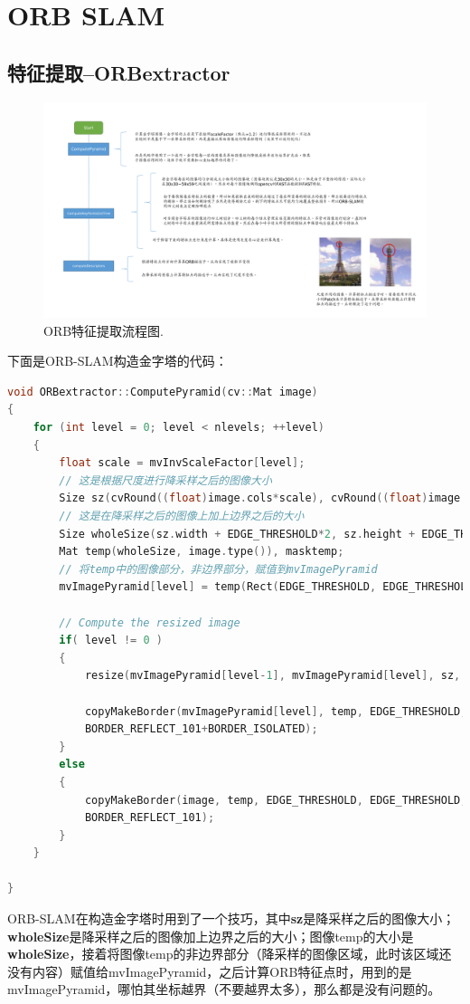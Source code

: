 \chapter{ORB SLAM}

\section{特征提取--ORBextractor}


\begin{figure}[h]%
	\centering  %
	\includegraphics[width=1.0\linewidth]{image/ORB-SLAM/ORBextractor.pdf}  %
	\caption{ORB特征提取流程图.}  %
	\label{fig:orb_extractor}   %
\end{figure}


下面是ORB-SLAM构造金字塔的代码：
\begin{lstlisting}[language = C++]
void ORBextractor::ComputePyramid(cv::Mat image)
{
	for (int level = 0; level < nlevels; ++level)
	{
		float scale = mvInvScaleFactor[level];
		// 这是根据尺度进行降采样之后的图像大小
		Size sz(cvRound((float)image.cols*scale), cvRound((float)image.rows*scale));
		// 这是在降采样之后的图像上加上边界之后的大小
		Size wholeSize(sz.width + EDGE_THRESHOLD*2, sz.height + EDGE_THRESHOLD*2);
		Mat temp(wholeSize, image.type()), masktemp;
		// 将temp中的图像部分，非边界部分，赋值到mvImagePyramid
		mvImagePyramid[level] = temp(Rect(EDGE_THRESHOLD, EDGE_THRESHOLD, sz.width, sz.height));
		
		// Compute the resized image
		if( level != 0 )
		{
			resize(mvImagePyramid[level-1], mvImagePyramid[level], sz, 0, 0, INTER_LINEAR);
			
			copyMakeBorder(mvImagePyramid[level], temp, EDGE_THRESHOLD, EDGE_THRESHOLD, EDGE_THRESHOLD, EDGE_THRESHOLD,
			BORDER_REFLECT_101+BORDER_ISOLATED);            
		}
		else
		{
			copyMakeBorder(image, temp, EDGE_THRESHOLD, EDGE_THRESHOLD, EDGE_THRESHOLD, EDGE_THRESHOLD,
			BORDER_REFLECT_101);            
		}
	}
	
}
\end{lstlisting}
ORB-SLAM在构造金字塔时用到了一个技巧，其中\textbf{sz}是降采样之后的图像大小；\textbf{wholeSize}是降采样之后的图像加上边界之后的大小；图像temp的大小是\textbf{wholeSize}，接着将图像temp的非边界部分（降采样的图像区域，此时该区域还没有内容）赋值给mvImagePyramid，之后计算ORB特征点时，用到的是mvImagePyramid，哪怕其坐标越界（不要越界太多），那么都是没有问题的。




